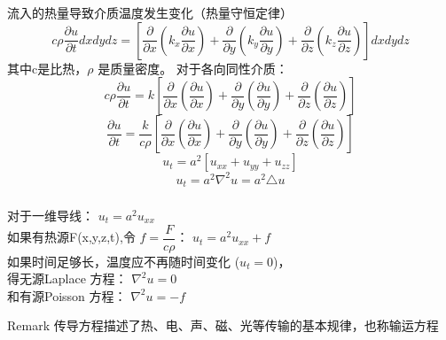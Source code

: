 \begin{frame}
	\frametitle{}	
	流入的热量导致介质温度发生变化（热量守恒定律）\\
	\begin{equation*}
		c \rho \frac{\partial u}{\partial t}dxdydz=[\frac{\partial }{\partial x} (k_x\frac{\partial u}{\partial x}) + \frac{\partial }{\partial y} (k_y\frac{\partial u}{\partial y}) + \frac{\partial }{\partial z} (k_z\frac{\partial u}{\partial z}) ]dxdydz 
	\end{equation*}
	其中c是比热，$\rho$ 是质量密度。 对于各向同性介质：
	\begin{equation*}
		c \rho \frac{\partial u }{\partial t}=k[\frac{\partial }{\partial x} (\frac{\partial u}{\partial x}) + \frac{\partial }{\partial y} (\frac{\partial u}{\partial y}) + \frac{\partial }{\partial z} (\frac{\partial u}{\partial z}) ]	
	\end{equation*}
	\begin{equation*}
		\frac{\partial u }{\partial t}=\frac{k}{c\rho}[\frac{\partial }{\partial x} (\frac{\partial u}{\partial x}) + \frac{\partial }{\partial y} (\frac{\partial u}{\partial y}) + \frac{\partial }{\partial z} (\frac{\partial u}{\partial z}) ]	
	\end{equation*}
	\begin{equation*}
		u_t=a^2 [u_{xx}   +u_{yy}  +u_{zz}] 
	\end{equation*}
	\begin{equation*}
		u_t=a^2 \nabla ^2 u = a^2 \triangle u	
	\end{equation*}
\end{frame}	

\begin{frame}
	\frametitle{}	
	对于一维导线：
	{ $\displaystyle u_t= a^2 u_{xx}$ }  \\ 
	如果有热源F(x,y,z,t),令 $f=\dfrac{F}{c\rho}$：	{$\displaystyle u_t= a^2 u_{xx}+f$ }  \\
	如果时间足够长，温度应不再随时间变化 ($u_t =0$)， \\ 
	得无源Laplace 方程： { $\displaystyle   \nabla ^2 u =0$ }  \\ 
	和有源Poisson 方程： { $\displaystyle   \nabla ^2 u =-f$ }  \\ 
	\begin{block}{Remark}
		传导方程描述了热、电、声、磁、光等传输的基本规律，也称输运方程
	\end{block}
\end{frame}	

